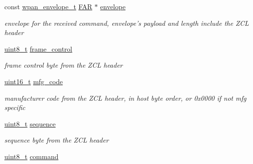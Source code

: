 \begin{DoxyCompactItemize}
\item 
\hypertarget{group__zcl_ga1c24c7848d60bc6aa335a8ba9fd14b7a}{const \hyperlink{structwpan__envelope__t}{wpan\-\_\-envelope\-\_\-t} \hyperlink{group__hal_gaef060b3456fdcc093a7210a762d5f2ed}{F\-A\-R} $\ast$ \hyperlink{group__zcl_ga1c24c7848d60bc6aa335a8ba9fd14b7a}{envelope}}\label{group__zcl_ga1c24c7848d60bc6aa335a8ba9fd14b7a}

\begin{DoxyCompactList}\small\item\em envelope for the received command, envelope's payload and length include the Z\-C\-L header \end{DoxyCompactList}\item 
\hypertarget{group__zcl_ga5226462a41663bc81a5d67c04f18868a}{\hyperlink{group__hal_gae1affc9ca37cfb624959c866a73f83c2}{uint8\-\_\-t} \hyperlink{group__zcl_ga5226462a41663bc81a5d67c04f18868a}{frame\-\_\-control}}\label{group__zcl_ga5226462a41663bc81a5d67c04f18868a}

\begin{DoxyCompactList}\small\item\em frame control byte from the Z\-C\-L header \end{DoxyCompactList}\item 
\hypertarget{group__zcl_ga011fb17c1112658806badaccba7a246d}{\hyperlink{group__hal_ga5a8b2dc9e45a9ee81a94ef304fb62505}{uint16\-\_\-t} \hyperlink{group__zcl_ga011fb17c1112658806badaccba7a246d}{mfg\-\_\-code}}\label{group__zcl_ga011fb17c1112658806badaccba7a246d}

\begin{DoxyCompactList}\small\item\em manufacturer code from the Z\-C\-L header, in host byte order, or 0x0000 if not mfg specific \end{DoxyCompactList}\item 
\hypertarget{group__zcl_gacb5c8866a58116314f6c8eda9dc3544c}{\hyperlink{group__hal_gae1affc9ca37cfb624959c866a73f83c2}{uint8\-\_\-t} \hyperlink{group__zcl_gacb5c8866a58116314f6c8eda9dc3544c}{sequence}}\label{group__zcl_gacb5c8866a58116314f6c8eda9dc3544c}

\begin{DoxyCompactList}\small\item\em sequence byte from the Z\-C\-L header \end{DoxyCompactList}\item 
\hypertarget{group__zcl_ga1a5aaa930940857f68f245eeb89506b5}{\hyperlink{group__hal_gae1affc9ca37cfb624959c866a73f83c2}{uint8\-\_\-t} \hyperlink{group__zcl_ga1a5aaa930940857f68f245eeb89506b5}{command}}\label{group__zcl_ga1a5aaa930940857f68f245eeb89506b5}


\end{DoxyCompactItemize}

